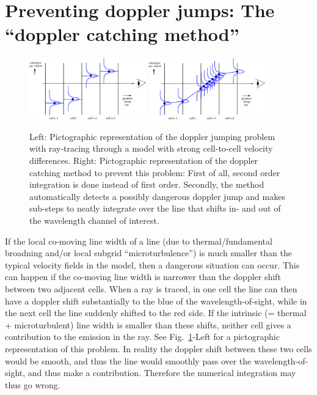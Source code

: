 \documentclass{report}
\begin{document}
\section{Preventing doppler jumps: The ``doppler catching method''}
\label{sec-doppler-catching}
%
\begin{figure}
\centerline{\includegraphics[width=0.45\textwidth]{line_doppjump.eps}
  \hspace{3em}\includegraphics[width=0.45\textwidth]{line_doppcatch.eps}}
\caption{\label{fig-doppler-catch}
Left: Pictographic representation of the doppler jumping problem with 
ray-tracing through a model with strong cell-to-cell velocity differences. 
Right: Pictographic representation of the doppler catching method to 
prevent this problem: First of all, second order integration is done
instead of first order. Secondly, the method automatically detects a
possibly dangerous doppler jump and makes sub-steps to neatly integrate
over the line that shifts in- and out of the wavelength channel of 
interest. 
}
\end{figure}
%
If the local co-moving line width of a line (due to thermal/fundamental
broadning and/or local subgrid ``microturbulence'') is much smaller than the
typical velocity fields in the model, then a dangerous situation can
occur. This can happen if the co-moving line width is narrower than the
doppler shift between two adjacent cells. When a ray is traced, in one cell
the line can then have a doppler shift substantially to the blue of the
wavelength-of-sight, while in the next cell the line suddenly shifted to the
red side. If the intrinsic (= thermal + microturbulent) line width is
smaller than these shifts, neither cell gives a contribution to the emission
in the ray. See Fig.~\ref{fig-doppler-catch}-Left for a pictographic
representation of this problem. In reality the doppler shift between these
two cells would be smooth, and thus the line would smoothly pass over the
wavelength-of-sight, and thus make a contribution. Therefore the numerical
integration may thus go wrong.
\end{document}
